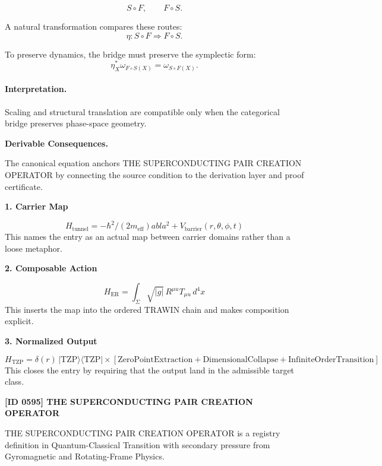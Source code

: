\begin{equation}
S\circ F,
\qquad
F\circ S.
\end{equation}

A natural transformation compares these routes:
\begin{equation}
\eta:S\circ F\Rightarrow F\circ S.
\end{equation}

To preserve dynamics, the bridge must preserve the symplectic form:
\begin{equation}
\boxed{
\eta_X^{*}\omega_{F\circ S(X)}
=
\omega_{S\circ F(X)}.
}
\end{equation}

\paragraph{Interpretation.}
Scaling and structural translation are compatible only when the categorical bridge preserves phase-space geometry.

\par\vspace{0.35em}
\noindent\textbf{Derivable Consequences.}\quad
\begingroup
\footnotesize
\raggedright
The canonical equation anchors THE SUPERCONDUCTING PAIR CREATION OPERATOR by connecting the source condition to the derivation layer and proof certificate.
\par\endgroup

\noindent\textbf{1. Carrier Map}\par
\[
H_{\text{tunnel}} = -\hbar^2/(2m_{\text{eff}})  abla^2 + V_{\text{barrier}}(r,\theta,\phi,t)
\]
\noindent This names the entry as an actual map between carrier domains rather than a loose metaphor.\par
\noindent\textbf{2. Composable Action}\par
\[
H_{\text{ER}} = \int_\Sigma \sqrt{|g|}\,R^{\mu u} T_{\mu u}\,d^4x
\]
\noindent This inserts the map into the ordered TRAWIN chain and makes composition explicit.\par
\noindent\textbf{3. Normalized Output}\par
\[
H_{\text{TZP}} = \delta(r)\,|\text{TZP}\rangle\langle\text{TZP}| \times [\text{ZeroPointExtraction} + \text{DimensionalCollapse} + \text{InfiniteOrderTransition}]
\]
\noindent This closes the entry by requiring that the output land in the admissible target class.\par

\clearpage
\noindent\textbf{[ID 0595] THE SUPERCONDUCTING PAIR CREATION OPERATOR}\par
\vspace{0.35em}
\begingroup\small
{}
THE SUPERCONDUCTING PAIR CREATION OPERATOR is a registry definition in Quantum-Classical Transition with secondary pressure from Gyromagnetic and Rotating-Frame Physics.

